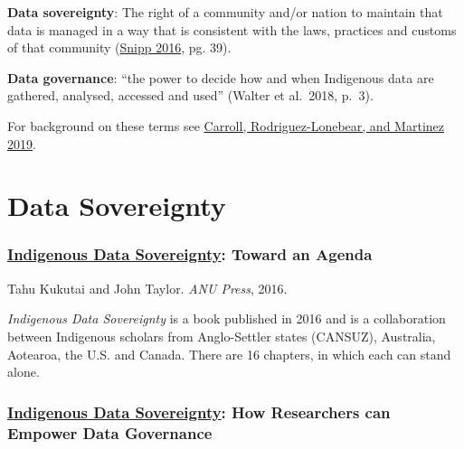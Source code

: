 \documentclass[
]{book}
\begin{document}
\textbf{Data sovereignty}: The right of a community and/or nation to maintain that data is managed in a way that is consistent with the laws, practices and customs of that community (\href{https://static1.squarespace.com/static/5d2633cb0ef5e4000134fa02/t/5d7a7610da91c0143184a9d1/1568306712324/Indigenous\%2BData\%2BSovereignty\%2BBook.pdf}{Snipp 2016}, pg. 39).

\textbf{Data governance}: ``the power to decide how and when Indigenous data are gathered, analysed, accessed and used'' (Walter et al.~2018, p.~3).

For background on these terms see \href{https://datascience.codata.org/articles/10.5334/dsj-2019-031/}{Carroll, Rodriguez-Lonebear, and Martinez 2019}.

\hypertarget{data-sovereignty}{%
\section{Data Sovereignty}\label{data-sovereignty}}

\hypertarget{indigenous-data-sovereignty-toward-an-agenda}{%
\subsubsection*{\texorpdfstring{\href{https://static1.squarespace.com/static/5d2633cb0ef5e4000134fa02/t/5d7a7610da91c0143184a9d1/1568306712324/Indigenous\%2BData\%2BSovereignty\%2BBook.pdf}{Indigenous Data Sovereignty}: Toward an Agenda}{Indigenous Data Sovereignty: Toward an Agenda}}\label{indigenous-data-sovereignty-toward-an-agenda}}

Tahu Kukutai and John Taylor. \emph{ANU Press}, 2016.

\emph{Indigenous Data Sovereignty} is a book published in 2016 and is a collaboration between Indigenous scholars from Anglo-Settler states (CANSUZ), Australia, Aotearoa, the U.S. and Canada. There are 16 chapters, in which each can stand alone.

\hypertarget{indigenous-data-sovereignty-how-researchers-can-empower-data-governance}{%
\subsubsection*{\texorpdfstring{\href{https://www.youtube.com/watch?v=RjolET69Z8c}{Indigenous Data Sovereignty}: How Researchers can Empower Data Governance}{Indigenous Data Sovereignty: How Researchers can Empower Data Governance}}\label{indigenous-data-sovereignty-how-researchers-can-empower-data-governance}}
\end{document}

